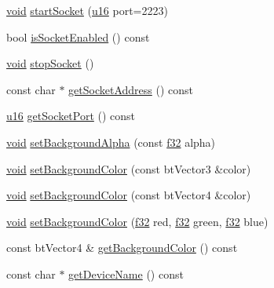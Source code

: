 \begin{DoxyCompactItemize}
\item 
\mbox{\hyperlink{_thread_8h_af1e856da2e658414cb2456cb6f7ebc66}{void}} \mbox{\hyperlink{classnjli_1_1_world_ac4b819fe8d34e6661d8f47138c318ff5}{start\+Socket}} (\mbox{\hyperlink{_util_8h_a9e6c91d77e24643b888dbd1a1a590054}{u16}} port=2223)
\item 
bool \mbox{\hyperlink{classnjli_1_1_world_a776f8bf7c461ecac1db1b485828f6894}{is\+Socket\+Enabled}} () const
\item 
\mbox{\hyperlink{_thread_8h_af1e856da2e658414cb2456cb6f7ebc66}{void}} \mbox{\hyperlink{classnjli_1_1_world_a7d217f38577d72d349e2df64761dc4c5}{stop\+Socket}} ()
\item 
const char $\ast$ \mbox{\hyperlink{classnjli_1_1_world_ac65ea60b2f5033c2e8a7504820d59ac5}{get\+Socket\+Address}} () const
\item 
\mbox{\hyperlink{_util_8h_a9e6c91d77e24643b888dbd1a1a590054}{u16}} \mbox{\hyperlink{classnjli_1_1_world_af108b41273b0ff7abbf88fa6e311304e}{get\+Socket\+Port}} () const
\item 
\mbox{\hyperlink{_thread_8h_af1e856da2e658414cb2456cb6f7ebc66}{void}} \mbox{\hyperlink{classnjli_1_1_world_a7eebf55a7920061d87e5dc03feb692da}{set\+Background\+Alpha}} (const \mbox{\hyperlink{_util_8h_a5f6906312a689f27d70e9d086649d3fd}{f32}} alpha)
\item 
\mbox{\hyperlink{_thread_8h_af1e856da2e658414cb2456cb6f7ebc66}{void}} \mbox{\hyperlink{classnjli_1_1_world_a011db5e9383aa6628892cd431c3657a5}{set\+Background\+Color}} (const bt\+Vector3 \&color)
\item 
\mbox{\hyperlink{_thread_8h_af1e856da2e658414cb2456cb6f7ebc66}{void}} \mbox{\hyperlink{classnjli_1_1_world_ab7bbd4dee42bec416fb2b64e9843ddf1}{set\+Background\+Color}} (const bt\+Vector4 \&color)
\item 
\mbox{\hyperlink{_thread_8h_af1e856da2e658414cb2456cb6f7ebc66}{void}} \mbox{\hyperlink{classnjli_1_1_world_a9f1b7c924b237316f9529a319c2ca055}{set\+Background\+Color}} (\mbox{\hyperlink{_util_8h_a5f6906312a689f27d70e9d086649d3fd}{f32}} red, \mbox{\hyperlink{_util_8h_a5f6906312a689f27d70e9d086649d3fd}{f32}} green, \mbox{\hyperlink{_util_8h_a5f6906312a689f27d70e9d086649d3fd}{f32}} blue)
\item 
const bt\+Vector4 \& \mbox{\hyperlink{classnjli_1_1_world_a7805d9b4c5ef0943a5c1c32b507d2151}{get\+Background\+Color}} () const
\item 
const char $\ast$ \mbox{\hyperlink{classnjli_1_1_world_a5ddb30abad714d14694863bb89af14b9}{get\+Device\+Name}} () const
\item 

\end{DoxyCompactItemize}
